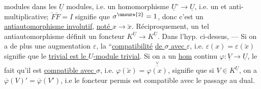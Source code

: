 modules dans les $\underline U$ modules, i.e. un
 homomorphisme $\underline U^\circ\longrightarrow\underline U$, i.e.
un 
et anti-multiplicative; $\breve F\breve F=I$ signifie
que $\sigma^{\unsure{2}}=1$, donc c'est un \uline{antiautomorphisme involutif}, \uline{noté $x\longrightarrow\breve x$}. Réciproquement,
un tel antiautomorphisme définit
 un foncteur $K^{\underline U}\longrightarrow K^{\underline U}$. Dans l'hyp. ci-dessus,  --- Si on a de
plus une augmentation $\varepsilon$, la ``\uline{compatibilité}
\uline{de $\sigma$ avec $\varepsilon$}, i.e. $\varepsilon(x)=\varepsilon(\breve x)$
signifie que le 
\uline{trivial est le $U$-module trivial}.  Si
on a un \uline{hom} continu $\varphi:\underline V\longrightarrow\underline U$, le
fait qu'il est \uline{compatible avec $\sigma$},
i.e. $\varphi(\breve x)=\overset{\vee}{\overline{\varphi(x)}}$, signifie que
  si $V\in K^{\underline U}$, on a
$\overline\varphi(V)'=\overline\varphi(V')$, i.e le foncteur
permis est compatible avec le
passage au dual.

